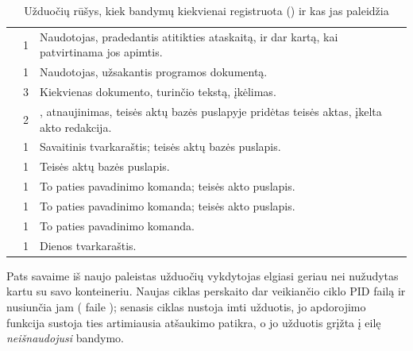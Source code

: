 \begin{table}[H]
\caption{Užduočių rūšys, kiek bandymų kiekvienai registruota () ir kas jas
paleidžia}\label{tab:ops:jobs}
\begin{tabularx}{\textwidth}{@{}L{48mm}C{16mm}Y@{}}
\toprule
{} &  &  \\
\midrule
{} & 1 & Naudotojas, pradedantis atitikties ataskaitą, ir dar kartą, kai patvirtinama jos apimtis. \\
 & 1 & Naudotojas, užsakantis programos dokumentą. \\
 & 3 & Kiekvienas dokumento, turinčio tekstą, įkėlimas. \\
 & 2 & , atnaujinimas, teisės aktų bazės puslapyje pridėtas teisės aktas, įkelta akto redakcija. \\
 & 1 & Savaitinis tvarkaraštis; teisės aktų bazės puslapis. \\
 & 1 & Teisės aktų bazės puslapis. \\
 & 1 & To paties pavadinimo komanda; teisės akto puslapis. \\
 & 1 & To paties pavadinimo komanda; teisės akto puslapis. \\
 & 1 & To paties pavadinimo komanda. \\
 & 1 & Dienos tvarkaraštis. \\
\bottomrule
\end{tabularx}
\end{table}

Pats savaime iš naujo paleistas užduočių vykdytojas elgiasi geriau nei nužudytas kartu su savo
konteineriu. Naujas ciklas perskaito dar veikiančio ciklo PID failą ir nusiunčia jam
 ( faile ); senasis
ciklas nustoja imti užduotis, jo apdorojimo funkcija sustoja ties artimiausia atšaukimo patikra,
o jo užduotis grįžta į eilę \emph{neišnaudojusi} bandymo.

